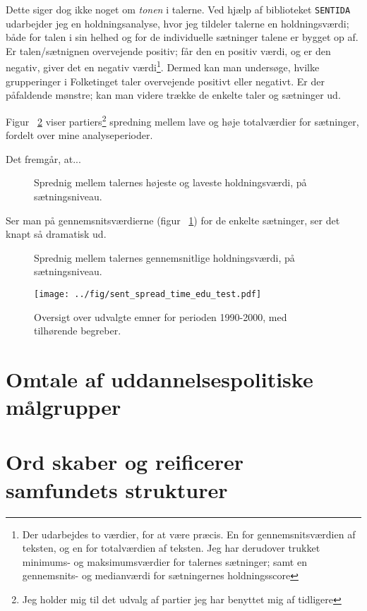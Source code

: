 Dette siger dog ikke noget om \textit{tonen} i talerne.
Ved hjælp af biblioteket \texttt{SENTIDA} udarbejder jeg en holdningsanalyse, hvor jeg tildeler talerne en holdningsværdi; både for talen i sin helhed og for de individuelle sætninger talene er bygget op af.
Er talen/sætnignen overvejende positiv; får den en positiv værdi, og er den negativ, giver det en negativ værdi\footnote{Der udarbejdes to værdier, for at være præcis. En for gennemsnitsværdien af teksten, og en for totalværdien af teksten. Jeg har derudover trukket minimums- og maksimumsværdier for talernes sætninger; samt en gennemsnits- og medianværdi for sætningernes holdningsscore}.
Dermed kan man undersøge, hvilke grupperinger i Folketinget taler overvejende positivt eller negativt.
Er der påfaldende mønstre; kan man videre trække de enkelte taler og sætninger ud.

Figur ~\ref{fig:sentposneg} viser partiers\footnote{Jeg holder mig til det udvalg af partier jeg har benyttet mig af tidligere} spredning mellem lave og høje totalværdier for sætninger, fordelt over mine analyseperioder.

Det fremgår, at...

\begin{figure}
  
\caption{Sprednig mellem talernes højeste og laveste holdningsværdi, på sætningsniveau.}
\label{fig:sentminmax}
\end{figure}

Ser man på gennemsnitsværdierne (figur ~\ref{fig:sentminmax})  for de enkelte sætninger, ser det knapt så dramatisk ud.

\begin{figure}
  
\caption{Sprednig mellem talernes gennemsnitlige holdningsværdi, på sætningsniveau.}
\label{fig:sentposneg}
\end{figure}

\begin{figure}
\begin{adjustwidth}{-1.6in}{-1.5in}
  \texttt{[image: ../fig/sent\_spread\_time\_edu\_test.pdf]}
\end{adjustwidth}
\caption{Oversigt over udvalgte emner for perioden 1990-2000, med tilhørende begreber.}
\label{fig:sentspread}
\end{figure}


\section{Omtale af uddannelsespolitiske målgrupper}

\section{Ord skaber og reificerer samfundets strukturer}

